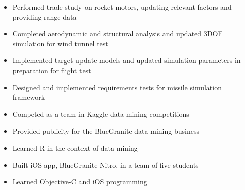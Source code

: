\documentclass{resume}
\begin{document}
\begin{itemize}
    \item Performed trade study on rocket motors, updating relevant factors and providing range data
    \item Completed aerodynamic and structural analysis and updated 3DOF simulation for wind tunnel test
    \item Implemented target update models and updated simulation parameters in preparation for flight test
    \item Designed and implemented requirements tests for missile simulation framework
\end{itemize}
\begin{itemize}
    \item Competed as a team in Kaggle data mining competitions
    \item Provided publicity for the BlueGranite data mining business
    \item Learned R in the context of data mining
\end{itemize}
\begin{itemize}
    \item Built iOS app, BlueGranite Nitro, in a team of five students
    \item Learned Objective-C and iOS programming
\end{itemize}
\end{document}
